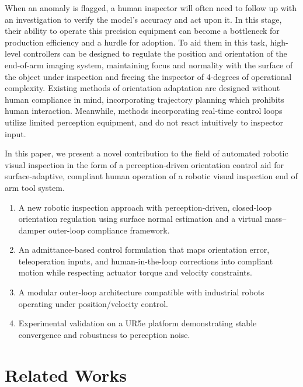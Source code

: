 \documentclass[journal]{IEEEtran}
\begin{document}
When an anomaly is flagged, a human inspector will often need to follow up with an investigation to verify the model's accuracy and act upon it. In this stage, their ability to operate this precision equipment can become a bottleneck for production efficiency and a hurdle for adoption. To aid them in this task, high-level controllers can be designed to regulate the position and orientation of the end-of-arm imaging system, maintaining focus and normality with the surface of the object under inspection and freeing the inspector of 4-degrees of operational complexity. Existing methods of orientation adaptation are designed without human compliance in mind, incorporating trajectory planning which prohibits human interaction. Meanwhile, methods incorporating real-time control loops utilize limited perception equipment, and do not react intuitively to inspector input.

In this paper, we present a novel contribution to the field of automated robotic visual inspection in the form of a perception-driven orientation control aid for surface-adaptive, compliant human operation of a robotic visual inspection end of arm tool system. 
\begin{enumerate}
\item A new robotic inspection approach with perception-driven, closed-loop orientation regulation using surface normal estimation and a virtual mass--damper outer-loop compliance framework.
\item An admittance-based control formulation that maps orientation error, teleoperation inputs, and human-in-the-loop corrections into compliant motion while respecting actuator torque and velocity constraints.
\item A modular outer-loop architecture compatible with industrial robots operating under position/velocity control.
\item Experimental validation on a UR5e platform demonstrating stable convergence and robustness to perception noise.
\end{enumerate}



\section{Related Works}
\end{document}
